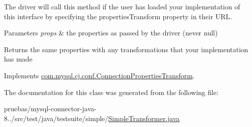 The driver will call this method if the user has loaded your implementation of this interface by specifying the \textquotesingle{}properties\+Transform\textquotesingle{} property in their U\+RL.


\begin{DoxyParams}{Parameters}
{\em props} & the properties as passed by the driver (never null)\\
\hline
\end{DoxyParams}
\begin{DoxyReturn}{Returns}
the same properties with any transformations that your implementation has made 
\end{DoxyReturn}


Implements \mbox{\hyperlink{interfacecom_1_1mysql_1_1cj_1_1conf_1_1_connection_properties_transform_ab1b0ebd09935c348ec99fb122e1a220b}{com.\+mysql.\+cj.\+conf.\+Connection\+Properties\+Transform}}.



The documentation for this class was generated from the following file\+:\begin{DoxyCompactItemize}
\item 
pruebas/mysql-\/connector-\/java-\/8../src/test/java/testsuite/simple/\mbox{\hyperlink{_simple_transformer_8java}{Simple\+Transformer.\+java}}\end{DoxyCompactItemize}
